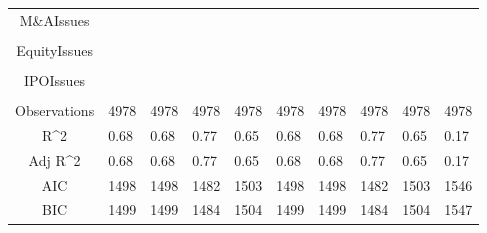 \documentclass{article}
\begin{document}
\begin{table}[H]
\begin{tabular}{|clllllllll|}
  M\&AIssues &  &  &  &  &  &  &  &  &  \\ 
   &  &  &  &  &  &  &  &  &  \\ 
  EquityIssues &  &  &  &  &  &  &  &  &  \\ 
   &  &  &  &  &  &  &  &  &  \\ 
  IPOIssues &  &  &  &  &  &  &  &  &  \\ 
   &  &  &  &  &  &  &  &  &  \\ 
  \hline 
 Observations & 4978 & 4978 & 4978 & 4978 & 4978 & 4978 & 4978 & 4978 & 4978 \\ 
  R^2 & 0.68 & 0.68 & 0.77 & 0.65 & 0.68 & 0.68 & 0.77 & 0.65 & 0.17 \\ 
  Adj R^2 & 0.68 & 0.68 & 0.77 & 0.65 & 0.68 & 0.68 & 0.77 & 0.65 & 0.17 \\ 
  AIC & 1498 & 1498 & 1482 & 1503 & 1498 & 1498 & 1482 & 1503 & 1546 \\ 
  BIC & 1499 & 1499 & 1484 & 1504 & 1499 & 1499 & 1484 & 1504 & 1547 \\ 
   \hline
\end{tabular}
 
\end{table}
\end{document}
